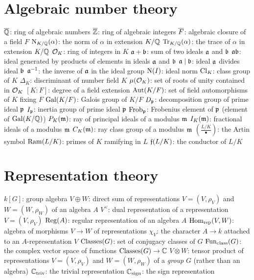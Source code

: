 \section{Algebraic number theory}
\begin{itemize}
	\ii $\ol \QQ$: ring of algebraic numbers
	\ii $\ol \ZZ$: ring of algebraic integers
	\ii $\ol F$: algebraic closure of a field $F$
	\ii $\NK(\alpha)$: the norm of $\alpha$ in extension $K/\QQ$
	\ii $\TrK(\alpha)$: the trace of $\alpha$ in extension $K/\QQ$
	\ii $\OO_K$: ring of integers in $K$
	\ii $\aa+\bb$: sum of two ideals $\aa$ and $\bb$
	\ii $\aa\bb$: ideal generated by products of elements in ideals $\aa$ and $\bb$
	\ii $\aa \mid \bb$: ideal $\aa$ divides ideal $\bb$
	\ii $\aa\inv$: the inverse of $\aa$ in the ideal group
	\ii $\Norm(I)$: ideal norm
	\ii $\Cl_K$: class group of $K$
	\ii $\Delta_K$: discriminant of number field $K$
	\ii $\mu(\OO_K)$: set of roots of unity contained in $\OO_K$
	\ii $[K:F]$: degree of a field extension
	\ii $\Aut(K/F)$: set of field automorphisms of $K$ fixing $F$
	\ii $\Gal(K/F)$: Galois group of $K/F$
	\ii $D_\pp$: decomposition group of prime ideal $\pp$
	\ii $I_\pp$: inertia group of prime ideal $\pp$
	\ii $\Frob_\pp$: Frobenius element of $\pp$ (element of $\Gal(K/\QQ)$)
	\ii $P_K(\mm)$: ray of principal ideals of a modulus $\mm$
	\ii $I_K(\mm)$: fractional ideals of a modulus $\mm$
	\ii $C_K(\mm)$: ray class group of a modulus $\mm$
	\ii $\left( \frac{L/K}{\bullet} \right)$: the Artin symbol
	\ii $\Ram(L/K)$: primes of $K$ ramifying in $L$
	\ii $\kf(L/K)$: the conductor of $L/K$
\end{itemize}

\section{Representation theory}
\begin{itemize}
	\ii $k[G]$: group algebra
	\ii $V \oplus W$: direct sum of representations $V = (V, \rho_V)$
	and $W = (W, \rho_W)$ of an algebra $A$
	\ii $V^\vee$: dual representation of a representation $V = (V, \rho_V)$
	\ii $\Reg(A)$: regular representation of an algebra $A$
	\ii $\Homrep(V,W)$: algebra of morphisms $V \to W$ of representations
	\ii $\chi_V$: the character $A \to k$ attached to an $A$-representation $V$
	\ii $\Classes(G)$: set of conjugacy classes of $G$
	\ii $\FunCl(G)$: the complex vector space of functions $\Classes(G) \to \CC$
	\ii $V \otimes W$: tensor product of representations $V = (V, \rho_V)$ and $W = (W, \rho_W)$
	of a \emph{group} $G$ (rather than an algebra)
	\ii $\Ctriv$: the trivial representation
	\ii $\Csign$: the sign representation
\end{itemize}

